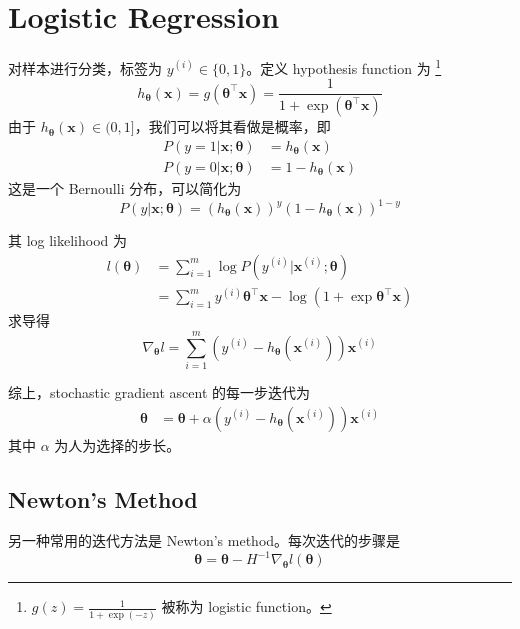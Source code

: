 \chapter{Logistic Regression}
	对样本进行分类，标签为 $ y^{(i)} \in \{0, 1\} $。定义 hypothesis function 为
	\footnote{$ g(z) = \frac{1}{1 + \exp(-z)} $ 被称为 logistic function。}
	\begin{equation}
		h_{\bm\theta}(\bm{x}) = g(\bm{\theta}^\intercal \bm{x}) = \frac{1}{1 + \exp{({\bm{\theta}}^\intercal \bm{x})}}
	\end{equation}
	由于 $ h_{\bm{\theta}}(\bm{x}) \in (0, 1] $，我们可以将其看做是概率，即
	\begin{align*}
		P(y=1 | \bm{x}; \bm{\theta}) &= h_{\bm{\theta}}(\bm{x}) \\
		P(y=0 | \bm{x}; \bm{\theta}) &= 1 - h_{\bm{\theta}}(\bm{x})
	\end{align*}
	这是一个 Bernoulli 分布，可以简化为 
	\begin{equation}
		P(y | \bm{x}; \bm{\theta}) = (h_{\bm{\theta}}(\bm{x}))^y (1 - h_{\bm{\theta}}(\bm{x}))^{1-y}
	\end{equation}
	
	其 log likelihood 为
	\begin{align*}
		l(\bm{\theta}) &= \sum_{i=1}^{m} \log P(y^{(i)} | \bm{x}^{(i)}; \bm{\theta}) \\
		&= \sum_{i=1}^{m} y^{(i)} \bm{\theta}^\intercal \bm{x} - \log(1+\exp \bm{\theta}^\intercal \bm{x}) 
	\end{align*}
	求导得
	\begin{equation}
		\nabla_{\bm{\theta}} l = \sum_{i=1}^{m} (y^{(i)} - h_{\bm{\theta}}(\bm{x}^{(i)})) \bm{x}^{(i)}
	\end{equation}
	
	综上，stochastic gradient ascent 的每一步迭代为 
	\begin{align*}
		\bm{\theta} &= \bm{\theta} + \alpha (y^{(i)} - h_{\bm{\theta}}(\bm{x}^{(i)})) \bm{x}^{(i)}
	\end{align*}
	其中 $ \alpha $ 为人为选择的步长。
	
	\section{Newton's Method}
		另一种常用的迭代方法是 Newton's method。每次迭代的步骤是
		\begin{equation}
			\bm{\theta} = \bm{\theta} - H^{-1} \nabla_{\bm{\theta}} l(\bm{\theta})
		\end{equation}